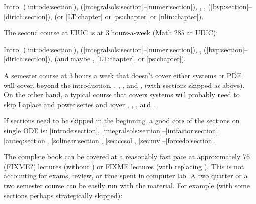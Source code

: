 \medskip

\noindent
\hyperref[intro:chapter]{Intro.} (\ref{introde:section}),
 (\ref{integralsols:section}--\ref{numer:section}),
,
,
 (\ref{bvp:section}--\ref{dirich:section}),
 (or
\ref{LT:chapter} or \ref{ps:chapter} or \ref{nlin:chapter}).

\medskip

The second course at UIUC is at 3 hours-a-week (Math 285 at UIUC):

\medskip

\noindent
\hyperref[intro:chapter]{Intro.} (\ref{introde:section}),
 (\ref{integralsols:section}--\ref{numer:section}),
,
 (\ref{bvp:section}--\ref{dirich:section}),
(and maybe ,
\ref{LT:chapter}, or \ref{ps:chapter}).

\medskip

A semester course at 3 hours a week that doesn't cover either systems or PDE
will cover, beyond the introduction,
,
,
, and ,
(with sections skipped as above).
On the other hand, a typical course that covers 
systems will probably need to skip Laplace and power series
and cover
,
,
, and .

\medskip

If sections need to be skipped in the beginning, a good core of the 
sections on single ODE is:
\ref{introde:section},
\ref{integralsols:section}--\ref{intfactor:section},
\ref{auteq:section},
\ref{solinear:section},
\ref{sec:ccsol},
\ref{sec:mv}--\ref{forcedo:section}.

\medskip

The complete book can be covered at a reasonably
fast pace at approximately 76 (FIXME?) lectures
(without )
or FIXME lectures (with  replacing
).
This is not accounting for exams, review,
or time spent in computer lab. %
A two quarter or a two semester course can be easily run with the material.
For example (with some sections perhaps strategically skipped):

\medskip

